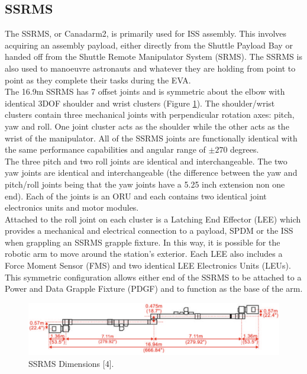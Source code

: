 \documentclass[a4paper,12pt,oneside]{report}
\begin{document}
\subsection{SSRMS}
The SSRMS, or Canadarm2, is primarily used for ISS assembly. This involves acquiring an assembly payload, either directly from the Shuttle Payload Bay or handed off from the Shuttle Remote Manipulator System (SRMS). The SSRMS is also used to manoeuvre astronauts and whatever they are holding from point to point as they complete their tasks during the EVA.\\
The 16.9m SSRMS has 7 offset joints and is symmetric about the elbow with identical 3DOF shoulder and wrist clusters (Figure \ref{SSRMS_dim}). The shoulder/wrist clusters contain three mechanical joints with perpendicular rotation axes: pitch, yaw and roll. One joint cluster acts as the shoulder while the other acts as the wrist of the manipulator. All of the SSRMS joints are functionally identical with the same performance capabilities and angular range of $\pm 270$ degrees. \\
The three pitch and two roll joints are identical and interchangeable. The two yaw joints are identical and interchangeable (the difference between the yaw and pitch/roll joints being that the yaw joints have a 5.25 inch extension non one end). Each of the joints is an ORU and each contains two identical joint electronics units and motor modules.\\
Attached to the roll joint on each cluster is a Latching End Effector (LEE) which provides a mechanical and electrical connection to a payload, SPDM or the ISS when grappling an SSRMS grapple fixture. In this way, it is possible for the robotic arm to move around the station's exterior. Each LEE also includes a Force Moment Sensor (FMS) and two identical LEE Electronics Units (LEUs). This symmetric configuration allows either end of the SSRMS to be attached to a Power and Data Grapple Fixture (PDGF) and to function as the base of the arm.\\
\begin{figure}[h]
  \centering
  \includegraphics[scale=0.3]{SSRMS_dimensions.png}
  \caption{SSRMS Dimensions [4].}
  \label{SSRMS_dim}
\end{figure}
\end{document}
